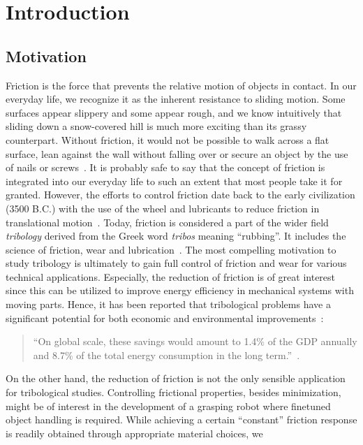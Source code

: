 \chapter{Introduction}


\section{Motivation}
Friction is the force that prevents the relative motion of objects in contact.
In our everyday life, we recognize it as the inherent resistance to sliding
motion. Some surfaces appear slippery and some appear rough, and we know intuitively
that sliding down a snow-covered hill is much more exciting than its grassy
counterpart. Without friction, it would not be possible to walk across a flat
surface, lean against the wall without falling over or secure an object by the
use of nails or screws~\cite[p. 5]{gnecco_meyer_2015}. It is probably safe to
say that the concept of friction is integrated into our everyday life to such an
extent that most people take it for granted. However, the efforts to control
friction date back to the early civilization (3500 B.C.) with the use of the
wheel and lubricants to reduce friction in translational
motion~\cite{bhushan_2013}. Today, friction is considered a part of the wider
field \textit{tribology} derived from the Greek word \textit{tribos} meaning
``rubbing''. It includes the science of friction, wear and
lubrication~\cite{bhushan_2013}. The most compelling motivation to study
tribology is ultimately to gain full control of friction and wear for various
technical applications. Especially, the reduction of friction is of great interest since this can be utilized to improve energy efficiency in mechanical systems with moving parts. Hence, it has been reported that
tribological problems have a significant potential for both economic and
environmental improvements~\cite{kim_nano-scale_2009}:
\begin{quote}
    ``On global scale, these savings would amount to 1.4\% of the GDP annually
    and 8.7\% of the total energy consumption in the long
    term.''~\cite{holmberg_influence_2017}. 
\end{quote}
On the other hand, the reduction of friction is not the only sensible
application for tribological studies. Controlling frictional properties, besides
minimization, might be of interest in the development of a grasping robot where
finetuned object handling is required. While achieving a certain ``constant''
friction response is readily obtained through appropriate material choices, we
